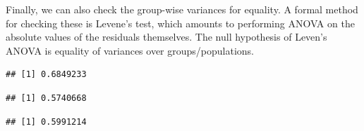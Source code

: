 \documentclass[
]{book}
\newenvironment{Shaded}{\begin{snugshade}}{\end{snugshade}}
\newcommand{\DecValTok}[1]{\textcolor[rgb]{0.00,0.00,0.81}{#1}}
\newcommand{\FunctionTok}[1]{\textcolor[rgb]{0.00,0.00,0.00}{#1}}
\newcommand{\NormalTok}[1]{#1}
\newcommand{\SpecialCharTok}[1]{\textcolor[rgb]{0.00,0.00,0.00}{#1}}
\begin{document}
Finally, we can also check the group-wise variances for equality. A formal method for checking these is Levene's test, which amounts to performing ANOVA on the absolute values of the residuals themselves. The null hypothesis of Leven's ANOVA is equality of variances over groups/populations.

\begin{Shaded}
\end{Shaded}

\begin{verbatim}
## [1] 0.6849233
\end{verbatim}

\begin{Shaded}
\end{Shaded}

\begin{verbatim}
## [1] 0.5740668
\end{verbatim}

\begin{Shaded}
\end{Shaded}

\begin{verbatim}
## [1] 0.5991214
\end{verbatim}
\end{document}
